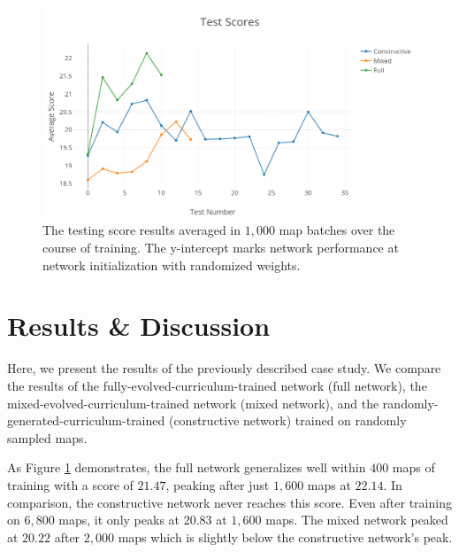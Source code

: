 \documentclass[letterpaper]{article} %
\begin{document}
\vspace{-1.21mm}
\vspace{-2.42mm}
\vspace{-3.63mm}
\begin{figure}[!htb]
\begin{center}
\includegraphics[width=1.0\linewidth]{graphics/test-scores.png}
\caption{The testing score results averaged in $1,000$ map batches over the course of training. The y-intercept marks network performance at network initialization with randomized weights.}
\label{fig:testing-results}
\end{center}
\end{figure}

\section{Results \& Discussion}\label{sec:results/discussion}
Here, we present the results of the previously described case study. We compare the results of the fully-evolved-curriculum-trained network (full network), the mixed-evolved-curriculum-trained network (mixed network), and the randomly-generated-curriculum-trained (constructive network) trained on randomly sampled maps.


As Figure \ref{fig:testing-results} demonstrates, the full network generalizes well within $400$ maps of training with a score of $21.47$, peaking after just $1,600$ maps at $22.14$. In comparison, the constructive network never reaches this score. Even after training on $6,800$ maps, it only peaks at $20.83$ at $1,600$ maps. The mixed network peaked at $20.22$ after $2,000$ maps which is slightly below the constructive network's peak.
\end{document}
